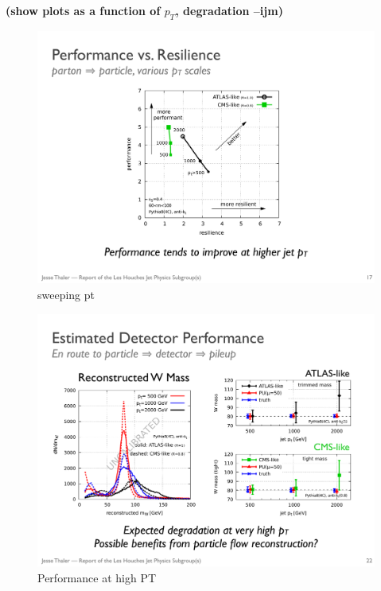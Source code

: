 \documentclass[11pt,letterpaper]{article}
\newcommand{\ijm}[1]{\textbf{\textcolor{llblue}{(#1 --ijm)}}}
\begin{document}
\ijm{show plots as a function of $p_T$, degradation}

\begin{figure}
\begin{center}
\includegraphics[width=0.4\columnwidth]{figures/sweep_pt}
\end{center}
\caption{sweeping pt}
\label{fig:sweep_pt}
\end{figure}

\begin{figure}
\begin{center}
\includegraphics[width=0.75\columnwidth]{figures/pt_degrade}
\end{center}
\caption{Performance at high PT}
\label{fig:nolabel}
\end{figure}
\end{document}
